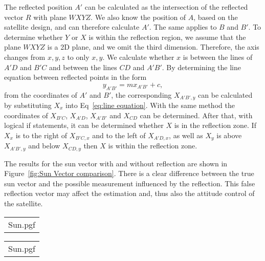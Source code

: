 The reflected position $A'$ can be calculated as the intersection of the reflected vector $R$ with plane $WXYZ$. We also know the position of $A$, based on the satellite design, and can therefore calculate $A'$. The same applies to $B$ and $B'$. To determine whether $Y$ or $X$ is within the reflection region, we assume that the plane $WXYZ$ is a 2D plane, and we omit the third dimension. Therefore, the axis changes from $x, y, z$ to only $x, y$. We calculate whether $x$ is between the lines of $A'D$ and $B'C$ and between the lines $CD$ and $A'B'$. By determining the line equation between reflected points in the form 
\begin{equation}
y_{A'B'} = mx_{A'B'} + c,
\label{eq:line equation}
\end{equation}
from the coordinates of $A'$ and $B'$, the corresponding $X_{A'B',y}$ can be calculated by substituting $X_x$ into Eq~\ref{eq:line equation}. With the same method the coordinates of $X_{B'C}$, $X_{A'D}$, $X_{A'B'}$ and $X_{CD}$ can be determined. After that, with logical if statements, it can be determined whether $X$ is in the reflection zone. If $X_x$ is to the right of $X_{B'C,x}$ and to the left of $X_{A'D,x}$, as well as $X_y$ is above $X_{A'B',y}$ and below $X_{CD,y}$ then $X$ is within the reflection zone. 

The results for the sun vector with and without reflection are shown in Figure~\ref{fig:Sun Vector comparison}. There is a clear difference between the true sun vector and the possible measurement influenced by the reflection.  This false reflection vector may affect the estimation and, thus also the attitude control of the satellite.

\begin{figure*}[!htb]
	\begin{tabular}{@{}c@{}}
		\centering
		{Sun.pgf}
		\label{fig:Sun Vector comparison with reflection}
	\end{tabular}
	\begin{tabular}{@{}c@{}}
		\centering
		{Sun.pgf} 
		\label{fig:Sun Vector comparison without reflection}
	\end{tabular}
	
	\caption{Comparison of Sun Vector with and without Reflection}
	\label{fig:Sun Vector comparison}
	
\end{figure*}

